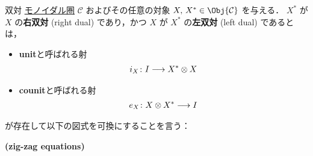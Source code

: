 \documentclass[TQFT_main]{subfiles}
\begin{document}
\begin{mydef}[label=def:dual,breakable]{双対}
    \hyperref[def:monoidal-category]{モノイダル圏} $\mathcal{C}$ およびその任意の対象 $X,\, X^* \in \Obj{\mathcal{C}}$ を与える．
    $X^*$ が $X$ の\textbf{右双対} (right dual) であり，かつ $X$ が $X^*$ の\textbf{左双対} (left dual) であるとは，
    \begin{itemize}
        \item \textbf{unit}と呼ばれる射
        \begin{align}
            i_X \colon I \longrightarrow X^* \otimes X
        \end{align}
        \item \textbf{counit}と呼ばれる射
        \begin{align}
            e_X \colon X \otimes X^* \longrightarrow I
        \end{align}
    \end{itemize}
    が存在して以下の図式を可換にすることを言う：
    \begin{description}
        \item[\textbf{(zig-zag equations)}]　
        
        \begin{center}
        \end{center}
        

        \begin{center}
        \end{center}
    \end{description}
\end{mydef}
\end{document}
